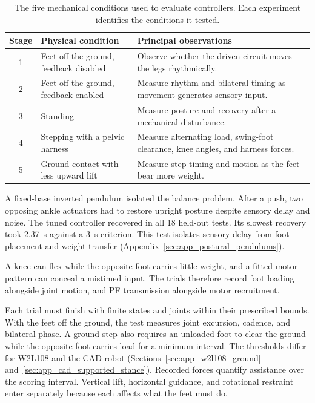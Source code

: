 \begin{table}[htbp]
\centering\small
\caption[Physical tasks for evaluating a controller]{The five mechanical conditions used to evaluate controllers. Each experiment identifies the conditions it tested.}
\label{tab:sns_curriculum}
\begin{tabularx}{\textwidth}{@{}c>{\raggedright\arraybackslash}p{}>{\raggedright\arraybackslash}X@{}}
\toprule
Stage & Physical condition & Principal observations \\
\midrule
1 & Feet off the ground, feedback disabled & Observe whether the driven circuit moves the legs rhythmically. \\
2 & Feet off the ground, feedback enabled & Measure rhythm and bilateral timing as movement generates sensory input. \\
3 & Standing & Measure posture and recovery after a mechanical disturbance. \\
4 & Stepping with a pelvic harness & Measure alternating load, swing-foot clearance, knee angles, and harness forces. \\
5 & Ground contact with less upward lift & Measure step timing and motion as the feet bear more weight. \\
\bottomrule
\end{tabularx}
\end{table}

A fixed-base inverted pendulum isolated the balance problem. After a push, two opposing ankle actuators had to restore upright posture despite sensory delay and noise. The tuned controller recovered in all 18 held-out tests. Its slowest recovery took \qty{2.37}{\second} against a \qty{3}{\second} criterion. This test isolates sensory delay from foot placement and weight transfer (Appendix~\ref{sec:app_postural_pendulums}).

A knee can flex while the opposite foot carries little weight, and a fitted motor pattern can conceal a mistimed input. The trials therefore record foot loading alongside joint motion, and PF transmission alongside motor recruitment.

Each trial must finish with finite states and joints within their prescribed bounds. With the feet off the ground, the test measures joint excursion, cadence, and bilateral phase. A ground step also requires an unloaded foot to clear the ground while the opposite foot carries load for a minimum interval. The thresholds differ for W2L108 and the CAD robot (Sections~\ref{sec:app_w2l108_ground} and~\ref{sec:app_cad_supported_stance}). Recorded forces quantify assistance over the scoring interval. Vertical lift, horizontal guidance, and rotational restraint enter separately because each affects what the feet must do.

